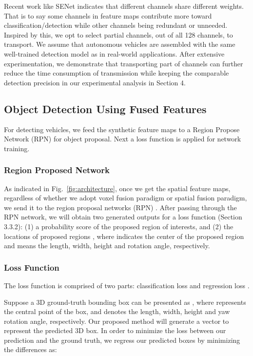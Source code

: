 \documentclass[sigconf]{acmart}
\begin{document}
Recent work like SENet \cite{hu2018squeeze} indicates that different channels share different weights. That is to say some channels in feature maps contribute more toward classification/detection while other channels being redundant or unneeded. Inspired by this, we opt to select partial channels, out of all 128 channels, to transport. We assume that autonomous vehicles are assembled with the same well-trained detection model as in real-world applications. After extensive experimentation, we demonstrate that transporting part of channels can further reduce the time consumption of transmission while keeping the comparable detection precision in our experimental analysis in Section 4. 



\subsection{\textbf{Object Detection Using Fused Features}}
For detecting vehicles, we feed the synthetic feature maps to a Region Propose Network (RPN) for object proposal. Next a loss function is applied for network training. 



\subsubsection{Region Proposed Network}

As indicated in Fig.~\ref{fig:architecture}, once we get the spatial feature maps, regardless of whether we adopt voxel fusion paradigm or spatial fusion paradigm, we send it to the region proposal networks (RPN)  \cite{zhou2018voxelnet}. After passing through the RPN network, we will obtain two generated outputs for a loss function (Section 3.3.2): (1) a probability score  of the proposed region of interests, and (2) the locations of proposed regions , where   indicates the center of the proposed region and  means the length, width, height and rotation angle, respectively.

\subsubsection{Loss Function}
The loss function is comprised of two parts: classification loss  and regression loss . 



Suppose a 3D ground-truth bounding box can be presented as , where  represents the central point of the box, and  denotes the length, width, height and yaw rotation angle, respectively. Our proposed method will generate a vector   to represent the predicted 3D box. In order to minimize the loss between our prediction and the ground truth, we regress our predicted boxes by minimizing the differences  \cite{girshick2014rich} as:
\end{document}

